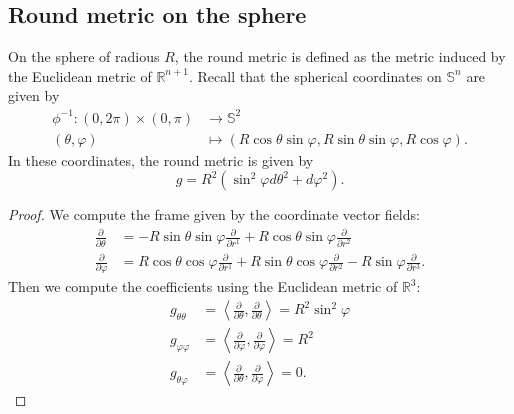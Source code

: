 \documentclass{report}
\begin{document}
\subsection{Round metric on the sphere}
    On the sphere of radious $R$, the round metric is defined as the metric induced by the Euclidean metric of $\mathbb R^{n+1}$.
    Recall that the spherical coordinates on $\mathbb S^n$ are given by
    \begin{align*}
        \phi^{-1}: (0,2\pi) \times (0,\pi) &\to \mathbb S^2\\
        (\theta, \varphi) &\mapsto (R \cos \theta \sin \varphi, R \sin \theta \sin \varphi, R \cos \varphi).
    \end{align*}
    In these coordinates, the round metric is given by
    \[
    g = R^2 (\sin^2 \varphi d\theta^2 + d\varphi^2).
    \]
    \begin{proof}
        We compute the frame given by the coordinate vector fields:
        \begin{align*}
            \frac{\partial}{\partial \theta} &= -R \sin \theta \sin \varphi \frac{\partial}{\partial r^1} + R \cos \theta \sin \varphi \frac{\partial}{\partial r^2}  \\
            \frac{\partial}{\partial \varphi} &= R \cos \theta \cos \varphi \frac{\partial}{\partial r^1} + R \sin \theta \cos \varphi \frac{\partial}{\partial r^2} - R \sin \varphi \frac{\partial}{\partial r^3}.
        \end{align*}
        Then we compute the coefficients using the Euclidean metric of $\mathbb R^3$:
    \begin{align*}
        g_{\theta \theta} &= \left\langle \frac{\partial}{\partial \theta}, \frac{\partial}{\partial \theta} \right\rangle = R^2 \sin^2 \varphi\\
        g_{\varphi \varphi} &= \left\langle \frac{\partial}{\partial \varphi}, \frac{\partial}{\partial \varphi} \right\rangle = R^2\\
        g_{\theta \varphi} &= \left\langle \frac{\partial}{\partial \theta}, \frac{\partial}{\partial \varphi} \right\rangle = 0.
    \end{align*}
    \end{proof}
\end{document}
